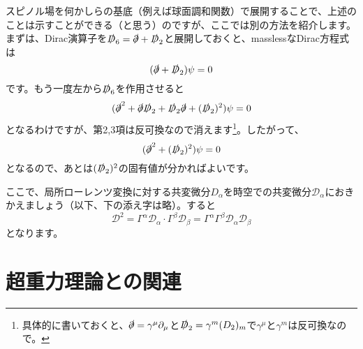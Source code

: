 \documentclass[unicode,a4paper,11pt]{ltjsarticle}
\begin{document}
スピノル場を何かしらの基底（例えば球面調和関数）で展開することで、上述のことは示すことができる（と思う）のですが、ここでは別の方法を紹介します。まずは、Dirac演算子を$\slashed{D}_{6}=\slashed{\partial}+\slashed{D}_{2}$と展開しておくと、masslessなDirac方程式は
\begin{equation}
   (\slashed{\partial}+\slashed{D}_{2})\psi
   =
   0
\end{equation}
です。もう一度左から$\slashed{D}_{6}$を作用させると
\begin{equation}
   (
      \slashed{\partial}^{2}
      +
      \slashed{\partial}\slashed{D}_{2}
      +
      \slashed{D}_{2}\slashed{\partial}
      +
      (\slashed{D}_{2})^{2}
   )\psi
   =
   0
\end{equation}
となるわけですが、第2,3項は反可換なので消えます\footnote{
   具体的に書いておくと、$\slashed{\partial}=\gamma^{\mu}\partial_{\mu}$と$\slashed{D}_{2}=\gamma^{m}(D_{2})_{m}$で$\gamma^{\mu}$と$\gamma^{m}$は反可換なので。
}。したがって、
\begin{equation}
   (
      \slashed{\partial}^{2}
      +
      (\slashed{D}_{2})^{2}
   )\psi
   =
   0   
\end{equation}
となるので、あとは$(\slashed{D}_{2})^{2}$の固有値が分かればよいです。

ここで、局所ローレンツ変換に対する共変微分$D_{\alpha}$を時空での共変微分$\mathcal{D}_{\alpha}$におきかえましょう（以下、下の添え字は略）。すると
\begin{equation}
   \mathcal{D}^2
   =
   \Gamma^{\alpha}\mathcal{D}_{\alpha}
   \cdot
   \Gamma^{\beta}\mathcal{D}_{\beta}
   =
   \Gamma^{\alpha}\Gamma^{\beta}
   \mathcal{D}_{\alpha}\mathcal{D}_{\beta}
\end{equation}
となります。











\clearpage

\section{超重力理論との関連}
\end{document}
